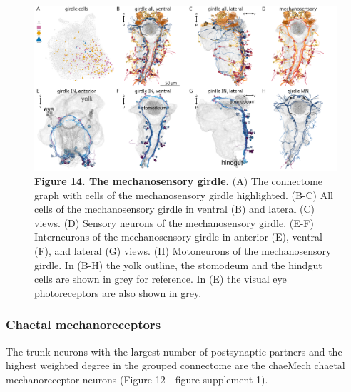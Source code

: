\documentclass[
  11pt,
]{article}
\begin{document}
\begin{figure}[H]

{\centering \includegraphics[width=1\textwidth,height=\textheight]{Figures/Figure14.png}

}

\caption{\textbf{Figure 14. The mechanosensory girdle.} (A) The
connectome graph with cells of the mechanosensory girdle highlighted.
(B-C) All cells of the mechanosensory girdle in ventral (B) and lateral
(C) views. (D) Sensory neurons of the mechanosensory girdle. (E-F)
Interneurons of the mechanosensory girdle in anterior (E), ventral (F),
and lateral (G) views. (H) Motoneurons of the mechanosensory girdle. In
(B-H) the yolk outline, the stomodeum and the hindgut cells are shown in
grey for reference. In (E) the visual eye photoreceptors are also shown
in grey.}

\end{figure}%

\subsubsection{Chaetal mechanoreceptors}\label{chaetal-mechanoreceptors}

The trunk neurons with the largest number of postsynaptic partners and
the highest weighted degree in the grouped connectome are the chaeMech
chaetal mechanoreceptor neurons (Figure 12---figure supplement 1).
\end{document}
